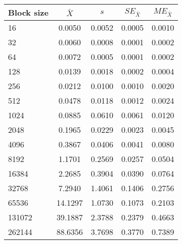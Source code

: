 \begin{tabular}{lcccc}\toprule
{\small Block size} & $\bar{X}$ & $s$ & $SE_{\bar{X}}$ & $ME_{\bar{X}}$ \\\midrule
16 & 0.0050 & 0.0052 & 0.0005 & 0.0010\\
32 & 0.0060 & 0.0008 & 0.0001 & 0.0002\\
64 & 0.0072 & 0.0005 & 0.0001 & 0.0002\\
128 & 0.0139 & 0.0018 & 0.0002 & 0.0004\\
256 & 0.0212 & 0.0100 & 0.0010 & 0.0020\\
512 & 0.0478 & 0.0118 & 0.0012 & 0.0024\\
1024 & 0.0885 & 0.0610 & 0.0061 & 0.0120\\
2048 & 0.1965 & 0.0229 & 0.0023 & 0.0045\\
4096 & 0.3867 & 0.0406 & 0.0041 & 0.0080\\
8192 & 1.1701 & 0.2569 & 0.0257 & 0.0504\\
16384 & 2.2685 & 0.3904 & 0.0390 & 0.0764\\
32768 & 7.2940 & 1.4061 & 0.1406 & 0.2756\\
65536 & 14.1297 & 1.0730 & 0.1073 & 0.2103\\
131072 & 39.1887 & 2.3788 & 0.2379 & 0.4663\\
262144 & 88.6356 & 3.7698 & 0.3770 & 0.7389\\
\bottomrule
\end{tabular}
